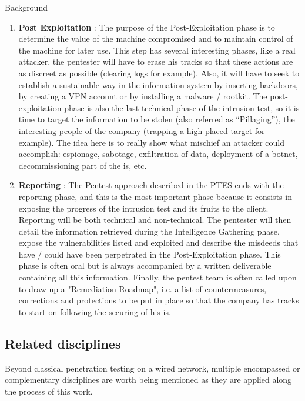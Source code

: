 \begin{chaptercover}{Background}
\begin{enumerate}
  \item \textbf{Post Exploitation} : The purpose of the Post-Exploitation phase is to determine the value of the machine compromised and to maintain control of the machine for later use. This step has several interesting phases, like a real attacker, the pentester will have to erase his tracks so that these actions are as discreet as possible (clearing logs for example). Also, it will have to seek to establish a sustainable way in the information system by inserting backdoors, by creating a VPN account or by installing a malware / rootkit. The post-exploitation phase is also the last technical phase of the intrusion test, so it is time to target the information to be stolen (also referred as “Pillaging”), the interesting people of the company (trapping a high placed target for example). The idea here is to really show what mischief an attacker could accomplish: espionage, sabotage, exfiltration of data, deployment of a botnet, decommissioning part of the \acrshort{is}, etc.
  \item \textbf{Reporting} : The Pentest approach described in the PTES ends with the reporting phase, and this is the most important phase because it consists in exposing the progress of the intrusion test and its fruits to the client. Reporting will be both technical and non-technical. The pentester will then detail the information retrieved during the Intelligence Gathering phase, expose the vulnerabilities listed and exploited and describe the misdeeds that have / could have been perpetrated in the Post-Exploitation phase. This phase is often oral but is always accompanied by a written deliverable containing all this information. Finally, the pentest team is often called upon to draw up a "Remediation Roadmap", i.e. a list of countermeasures, corrections and protections to be put in place so that the company has tracks to start on following the securing of his \acrshort{is}.
\end{enumerate}

\subsection{Related disciplines}

Beyond classical penetration testing on a wired network, multiple encompassed or complementary disciplines are worth being mentioned as they are applied along the process of this work.


\end{chaptercover}
